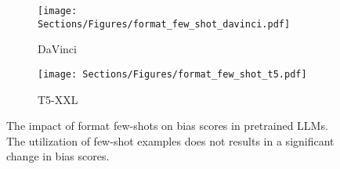 \begin{figure}[t!]
\centering
\begin{subfigure}[t]{0.5\textwidth}
\centering
    \texttt{[image: Sections/Figures/format\_few\_shot\_davinci.pdf]}
    \caption{DaVinci}
    \label{fig:few_shot_davinci}
\end{subfigure}%
\hfill
\begin{subfigure}[t]{0.5\textwidth}
\centering
    \texttt{[image: Sections/Figures/format\_few\_shot\_t5.pdf]}
    \caption{T5-XXL}
    \label{fig:few_shot_T5}
\end{subfigure}
\caption{The impact of format few-shots on bias scores in pretrained LLMs. The utilization of few-shot examples does not results in a significant change in bias scores.}
\label{fig:few_shot_pretrained}
\end{figure}